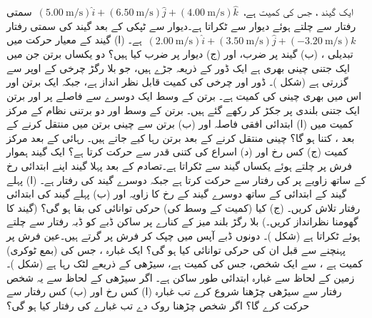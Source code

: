 ایک گیند ، جس کی کمیت  ہے، 
\(\,(\SI{5.00}{\meter\per\second})\hat{i}+(\SI{6.50}{\meter\per\second})\hat{j}+(\SI{4.00}{\meter\per\second})\hat{k}\,\)
سمتی رفتار سے چلتے ہوئے دیوار سے ٹکراتا ہے۔دیوار سے ٹپکی  کے بعد گیند  کی سمتی رفتار 
\(\,(\SI{2.00}{\meter\per\second})\hat{i}+(\SI{3.50}{\meter\per\second})\hat{j}+(\SI{-3.20}{\meter\per\second})\hat{k}\,\)
  ہے۔  (ا) گیند کے معیار حرکت میں تبدیلی ، (ب)  گیند  پر ضرب،  اور (ج) دیوار پر ضرب کیا ہیں؟
دو یکساں برتن جن میں  ایک جتنی   چینی بھری ہے ایک  ڈور کے ذریعہ جڑے ہیں، جو بلا رگڑ چرخی کے اوپر  سے گزرتی ہے (شکل )۔ ڈور اور چرخی کی کمیت قابل نظر انداز ہے، جبکہ  ایک  برتن اور اس میں بھری چینی کی کمیت  ہے۔ برتن کے  وسط ایک دوسرے سے  فاصلے پر اور برتن  ایک جتنی بلندی پر   جکڑ کر رکھے گئے ہیں۔ برتن  کے وسط  اور  دو برتنی نظام  کے مرکز کمیت میں (ا) ابتدائی  افقی فاصلہ  اور (ب) برتن  سے  چینی برتن  میں منتقل کرنے کے بعد  ، کتنا ہو گا؟ چینی منتقل کرنے کے بعد برتن رہا کیے جاتے ہیں۔ رہائی کے بعد مرکز کمیت  (ج) کس رخ  اور  (د)  اسراع  کی کتنی قدر  سے حرکت کرتا ہے؟
ایک گیند ہموار فرش پر چلتے ہوئے یکساں گیند سے ٹکراتا ہے۔تصادم کے بعد پہلا گیند  اپنے  ابتدائی رخ کے ساتھ  زاویے پر  کی رفتار سے حرکت کرتا ہے جبکہ دوسرے  گیند کی رفتار  ہے۔ (ا)  پہلے گیند کے   ابتدائی  کے ساتھ دوسرے گیند  کے رخ کا زاویہ   اور (ب) پہلے گیند کی ابتدائی  رفتار  تلاش کریں۔ (ج)  کیا (کمیت  کے وسط کی)  حرکی توانائی کی بقا ہو گی؟ (گیند کا گھومنا نظرانداز کریں۔)
بلا رگڑ    بلند  میز کے کنارے پر ساکن   ڈبے  کو      ڈبہ   رفتار سے چلتے ہوئے ٹکراتا ہے (شکل )۔ دونوں ڈبے آپس میں چپک کر فرش پر گرتے ہیں۔عین  فرش  پر پہنچنے سے قبل ان کی حرکی توانائی کیا ہو گی؟
ایک غبارہ ، جس کی (بمع ٹوکری)  کمیت   ہے ، سے    ایک شخص، جس کی کمیت  ہے،  سیڑھی کے ذریعے  لٹک رہا ہے (شکل )۔  زمین کے لحاظ سے غبارہ ابتدائی طور ساکن ہے۔ اگر  سیڑھی کے لحاظ سے   یہ شخص  رفتار سے سیڑھی چڑھنا  شروع کرے تب غبارہ  (ا)  کس رخ اور (ب) کس رفتار سے حرکت کرے گا؟ اگر شخص چڑھنا روک دے تب غبارے کی رفتار کیا ہو گی؟
